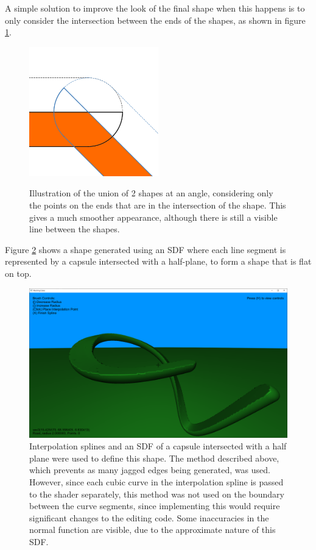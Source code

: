 \documentclass{article}
\begin{document}
A simple solution to improve the look of the final shape when this happens is to only consider the intersection between the ends of the shapes, as shown in figure \ref{fig:smooth_road}. 

\begin{figure}
  \caption{Illustration of the union of 2 shapes at an angle, considering only the points on the ends that are in the intersection of the shape. This gives a much smoother appearance, although there is still a visible line between the shapes.}
  \includegraphics[width=0.5\textwidth]{smooth_road}
  \label{fig:smooth_road}
\end{figure}

Figure \ref{fig:bezier_roads} shows a shape generated using an SDF where each line segment is represented by a capsule intersected with a half-plane, to form a shape that is flat on top.
\begin{figure}[H]
  \includegraphics[width=\textwidth]{bezier_roads.png}
  \caption{Interpolation splines and an SDF of a capsule intersected with a half plane were used to define this shape. The method described above, which prevents as many jagged edges being generated, was used. However, since each cubic curve in the interpolation spline is passed to the shader separately, this method was not used on the boundary between the curve segments, since implementing this would require significant changes to the editing code. Some inaccuracies in the normal function are visible, due to the approximate nature of this SDF.}
  \label{fig:bezier_roads}
\end{figure}
\end{document}
